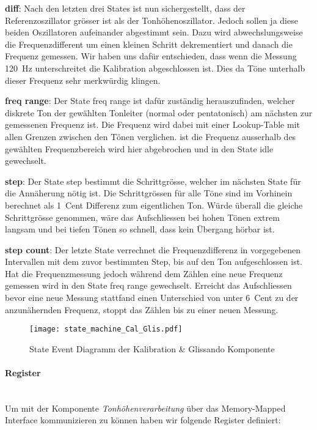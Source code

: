 \textbf{diff}:
Nach den letzten drei States ist nun sichergestellt, dass der Referenzoszillator grösser ist als der Tonhöhenoszillator. Jedoch sollen ja diese beiden Oszillatoren aufeinander abgestimmt sein. Dazu wird abwechslungsweise die Frequenzdifferent um einen kleinen Schritt dekrementiert und danach die Frequenz gemessen. Wir haben uns dafür entschieden, dass wenn die Messung \SI{120}{Hz} unterschreitet die Kalibration abgeschlossen ist. Dies da Töne unterhalb dieser Frequenz sehr merkwürdig klingen.

\textbf{freq range}:
Der State freq range ist dafür zuständig herauszufinden, welcher diskrete Ton der gewählten Tonleiter (normal oder pentatonisch) am nächsten zur gemessenen Frequenz ist. Die Frequenz wird dabei mit einer Lookup-Table mit allen Grenzen zwischen den Tönen verglichen. ist die Frequenz ausserhalb des gewählten Frequenzbereich wird hier abgebrochen und in den State idle gewechselt.

\textbf{step}:
Der State step bestimmt die Schrittgrösse, welcher im nächsten State für die Annäherung nötig ist. Die Schrittgrössen für alle Töne sind im Vorhinein berechnet als \SI{1}{Cent} Differenz zum eigentlichen Ton. Würde überall die gleiche Schrittgrösse genommen, wäre das Aufschliessen bei hohen Tönen extrem langsam und bei tiefen Tönen so schnell, dass kein Übergang hörbar ist. 

\textbf{step count}:
Der letzte State verrechnet die Frequenzdifferenz in vorgegebenen Intervallen mit dem zuvor bestimmten Step, bis auf den Ton aufgeschlossen ist. Hat die Frequenzmessung jedoch während dem Zählen eine neue Frequenz gemessen wird in den State freq range gewechselt. Erreicht das Aufschliessen bevor eine neue Messung stattfand einen Unterschied von unter \SI{6}{Cent} zu der anzunähernden Frequenz, stoppt das Zählen bis zu einer neuen Messung.

\begin{figure}[h!]
	\centering
	\texttt{[image: state\_machine\_Cal\_Glis.pdf]}
	\caption{State Event Diagramm der Kalibration \& Glissando Komponente} 
	\label{img:state_event_Cal_Glis}
\end{figure} 

\paragraph{Register}\mbox{}\\
Um mit der Komponente \textit{Tonhöhenverarbeitung} über das Memory-Mapped Interface kommunizieren zu können haben wir folgende Register definiert:

